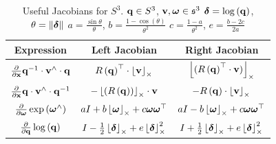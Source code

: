 \begin{table}[ht]
\caption{Useful Jacobians for $S^{3}$. \newline
		$\mathbf{q}\in S^{3}$, $\mathbf{v},\boldsymbol{\omega}\in\mathfrak{s}^{3}$ \newline
		$\boldsymbol{\delta}=\log\left(\mathbf{q}\right)$, $\theta=\left\|\boldsymbol{\delta}\right\|$ \newline
	    $a=\frac{\sin\theta}{\theta}$, $b=\frac{1-\cos\left(\theta\right)}{\theta^{2}}$ \newline
	    $c=\frac{1-a}{\theta^{2}}$, $e=\frac{b-2c}{2a}$
	    }
\label{tab:lie_identities_s3}
\bgroup
\def\arraystretch{2.0}
\begin{tabular}{ccc}
	\toprule
	Expression & Left Jacobian & Right Jacobian\\
	\midrule
	$\frac{\partial}{\partial\mathbf{x}}\mathbf{q}^{-1}\cdot\mathbf{v}^{\wedge}\cdot\mathbf{q}$ & $R\left(\mathbf{q}\right)^{\top}\cdot\left\lfloor\mathbf{v}\right\rfloor_{\times}$ & $\left\lfloor(R\left(\mathbf{q}\right)^{\top}\cdot\mathbf{v})\right\rfloor_{\times}$\\
	$\frac{\partial}{\partial\mathbf{x}}\mathbf{q}\cdot\mathbf{v}^{\wedge}\cdot\mathbf{q}^{-1}$ & $-\left\lfloor(R\left(\mathbf{q}\right))\right\rfloor_{\times}\cdot\mathbf{v}$ & $-R\left(\mathbf{q}\right)\cdot\left\lfloor\mathbf{v}\right\rfloor_{\times}$\\
	$\frac{\partial}{\partial\boldsymbol{\omega}}\exp\left(\boldsymbol{\omega}^{\wedge}\right)$ & $aI+b\left\lfloor\boldsymbol{\omega}\right\rfloor_{\times}+c\boldsymbol{\omega}\boldsymbol{\omega}^{\top}$ & $aI-b\left\lfloor\boldsymbol{\omega}\right\rfloor_{\times}+c\boldsymbol{\omega}\boldsymbol{\omega}^{\top}$\\
	$\frac{\partial}{\partial\mathbf{q}}\log\left(\mathbf{q}\right)$ & $I-\frac{1}{2}\left\lfloor\boldsymbol{\delta}\right\rfloor_{\times}+e\left\lfloor\boldsymbol{\delta}\right\rfloor_{\times}^{2}$ & $I+\frac{1}{2}\left\lfloor\boldsymbol{\delta}\right\rfloor_{\times}+e\left\lfloor\boldsymbol{\delta}\right\rfloor_{\times}^{2}$\\
	\bottomrule
\end{tabular}
\egroup
\end{table}

